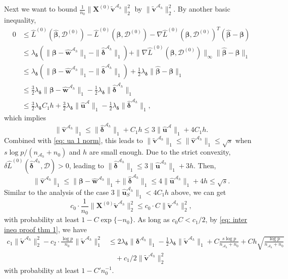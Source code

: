 \documentclass[12pt]{article}
\newcommand{\bdelta}{\bm{\delta}}
\newcommand{\bdeltaah}{\bm{\delta}^{\mathcal{A}_h}}
\newcommand{\hdeltaah}{\hat{\bm{\delta}}^{\mathcal{A}_h}}
\newcommand{\infnorm}[1]{\|#1\|_{\infty}}
\newcommand{\twonorm}[1]{\|#1\|_{2}}
\newcommand{\onenorm}[1]{\|#1\|_{1}}
\newcommand{\bbeta}{\bm{\beta}}
\newcommand{\hbeta}{\hat{\bm{\beta}}}
\newcommand{\bXk}[1]{\bm{X}^{(#1)}}
\newcommand{\hua}{\hat{\bm{u}}^{\mathcal{A}}}
\newcommand{\huah}{\hat{\bm{u}}^{\mathcal{A}_h}}
\newcommand{\bv}{\bm{v}}
\newcommand{\hvah}{\hat{\bm{v}}^{\mathcal{A}_h}}
\newcommand{\hwah}{\hat{\bm{w}}^{\mathcal{A}_h}}
\newcommand{\mah}{\mathcal{A}_h}
\newcommand{\md}{\mathcal{D}}
\newcommand{\nah}{n_{\mathcal{A}_h}}
\newcommand{\<}{\langle}
\renewcommand{\>}{\rangle}
\begin{document}
		Next we want to bound $\frac{1}{n_0}\twonorm{\bXk{0}\tilde{\bv}^{\mah}}^2$ by $\twonorm{\tilde{\bv}^{\mah}}^2$. By another basic inequality, 
		\begin{align}
			0&\leq \hat{L}^{(0)}(\hbeta, \md^{(0)}) - \hat{L}^{(0)}(\bbeta, \md^{(0)}) - \nabla \hat{L}^{(0)}(\bbeta, \md^{(0)})^T (\hbeta-\bbeta) \\
			&\leq \lambda_{\bdelta}(\onenorm{\bbeta-\hwah} - \onenorm{\hdeltaah}) + \infnorm{\nabla \hat{L}^{(0)}(\bbeta, \md^{(0)})}\onenorm{\hbeta-\bbeta}\\
			&\leq \lambda_{\bdelta}(\onenorm{\bbeta-\hwah} - \onenorm{\hdeltaah}) + \frac{1}{2}\lambda_{\bdelta}\onenorm{\hbeta-\bbeta}\\
			&\leq \frac{3}{2}\lambda_{\bdelta}\onenorm{\bbeta-\hwah} - \frac{1}{2}\lambda_{\bdelta}\onenorm{\hdeltaah}\\
			&\leq \frac{3}{2}\lambda_{\bdelta}C_1h + \frac{3}{2}\lambda_{\bdelta}\onenorm{\hua} - \frac{1}{2}\lambda_{\bdelta}\onenorm{\hdeltaah},
		\end{align}
		which implies
		\begin{equation}
			\onenorm{\hvah} \leq \onenorm{\hdeltaah} + C_1h \leq 3\onenorm{\hua} + 4C_1h.
		\end{equation}
		Combined with \eqref{eq: ua 1 norm}, this leads to $\onenorm{\tilde{\bv}^{\mah}} \leq \onenorm{\hvah} \leq \sqrt{s}$ when $s\log p/(\nah+n_0)$ and $h$ are small enough. Due to the strict convexity, $\delta \hat{L}^{(0)}(\hdeltaah, \md) > 0$, leading to $\onenorm{\hdeltaah} \leq 3\onenorm{\huah} + 3h$. Then,
		\begin{equation}\label{eq: sec step left 1}
			\onenorm{\hvah} \leq \onenorm{\bbeta - \hwah} + \onenorm{\hdeltaah} \leq 4\onenorm{\huah} + 4h \leq \sqrt{s}.
		\end{equation}
		Similar to the analysis of the case $3\onenorm{\huah_{S}} < 4C_1h$ above, we can get
		\begin{equation}
			c_0 \cdot \frac{1}{n_0}\twonorm{\bXk{0}\tilde{\bv}^{\mah}}^2 \leq c_0 \cdot C\twonorm{\tilde{\bv}^{\mah}}^2,
		\end{equation}
		with probability at least $1- C\exp\{-n_0\}$.
		As long as $c_0 C < c_1/2$, by \eqref{eq: inter ineq proof thm 1}, we have
		\begin{align}
			c_1\twonorm{\tilde{\bv}^{\mah}}^2 - c_2\cdot \frac{\log p}{n_0}\onenorm{\tilde{\bv}^{\mah}}^2 &\leq 2\lambda_{\bdelta}\onenorm{\bdeltaah} - \frac{1}{2}\lambda_{\bdelta}\onenorm{\tilde{\bv}^{\mah}}  + C\frac{s\log p}{\nah+n_0} + Ch \sqrt{\frac{\log p}{\nah + n_0}} \\
			&\quad + c_1/2\twonorm{\tilde{\bv}^{\mah}}^2 \label{eq: important in proof of thm 1}
		\end{align}
		with probability at least $1-C'n_0^{-1}$.
		
\end{document}
